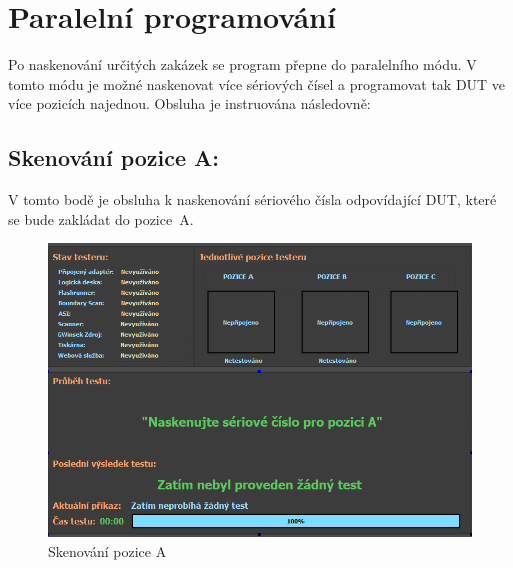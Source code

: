 \clearpage
\section{Paralelní programování}
Po naskenování určitých zakázek se program přepne do paralelního módu.
V tomto módu je možné naskenovat více sériových čísel a programovat tak DUT ve více pozicích najednou. Obsluha je instruována následovně:\\
\subsection{Skenování pozice A:}
V tomto bodě je obsluha k naskenování sériového čísla odpovídající DUT, které se bude zakládat do \mbox{pozice A.}
	\begin{figure}[ht!]
		\centering
		\includegraphics[height = 0.22\textheight]{obrazky/dual_SCAN_A.PNG}
        \caption{Skenování pozice A}
	\end{figure}

